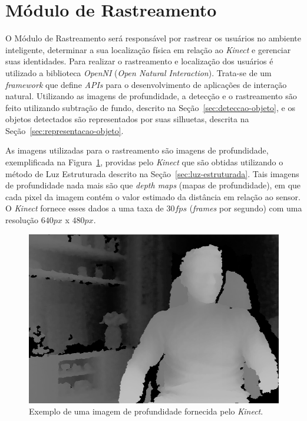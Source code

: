 \section{Módulo de Rastreamento}

	O Módulo de Rastreamento será responsável por rastrear os usuários no ambiente inteligente, determinar a sua localização física em relação ao \textit{Kinect} e gerenciar suas identidades. Para realizar o rastreamento e localização dos usuários é utilizado a biblioteca \textit{OpenNI} (\textit{Open Natural Interaction}). Trata-se de um \textit{framework} que define \textit{APIs} para o desenvolvimento de aplicações de interação natural. Utilizando as imagens de profundidade, a detecção e o rastreamento são feito utilizando subtração de fundo, descrito na Seção~\ref{sec:deteccao-objeto}, e os objetos detectados são representados por suas silhuetas, descrita na Seção~\ref{sec:representacao-objeto}.

	As imagens utilizadas para o rastreamento são imagens de profundidade, exemplificada na Figura~\ref{fig:depthmaps}, providas pelo \textit{Kinect} que são obtidas utilizando o método de Luz Estruturada descrito na Seção~\ref{sec:luz-estruturada}. Tais imagens de profundidade nada mais são que \textit{depth maps} (mapas de profundidade), em que cada pixel da imagem contém o valor estimado da distância em relação ao sensor. O \textit{Kinect} fornece esses dados a uma taxa de $\displaystyle 30 fps$ (\textit{frames} por segundo) com uma resolução $\displaystyle 640px$ x $\displaystyle 480px$.
	

	\begin{figure}[H]
		\begin{center}
			\includegraphics[scale=0.45]{figuras/4.ProblemaEProposta/mapa-profundidade.png}
		\end{center}
		\caption{Exemplo de uma imagem de profundidade fornecida pelo \textit{Kinect}.}
		\label{fig:depthmaps}
	\end{figure}

